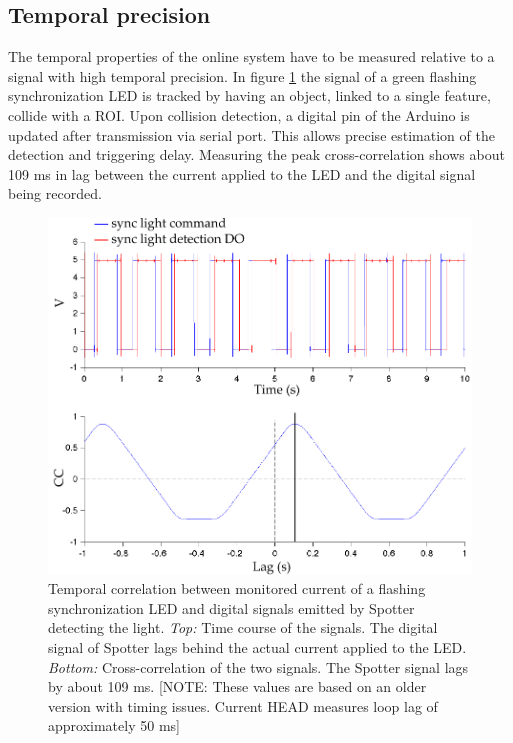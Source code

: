 \subsection{Temporal precision}
\label{sec:TemporalPrecision}

The temporal properties of the online system have to be measured relative to a signal with high temporal precision. In figure \ref{fig:temporal} the signal of a green flashing synchronization LED is tracked by having an object, linked to a single feature, collide with a ROI. Upon collision detection, a digital pin of the Arduino is updated after transmission via serial port. This allows precise estimation of the detection and triggering delay. Measuring the peak cross-correlation shows about 109 ms in lag between the current applied to the LED and the digital signal being recorded.

\begin{figure}[H] %
	\centering
		\includegraphics [width=\linewidth]{gfx/temporal.pdf} %
	\caption[Test]{Temporal correlation between monitored current of a flashing synchronization LED and digital signals emitted by Spotter detecting the light. \emph{Top:} Time course of the signals. The digital signal of Spotter lags behind the actual current applied to the LED. \emph{Bottom:} Cross-correlation of the two signals. The Spotter signal lags by about 109 ms. [NOTE: These values are based on an older version with timing issues. Current HEAD measures loop lag of approximately 50 ms]}
	\label{fig:temporal}
\end{figure}

